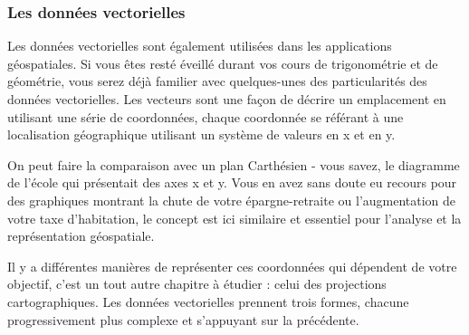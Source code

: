 \subsubsection{Les données vectorielles}\label{label_vectordata}

Les données vectorielles sont également utilisées dans les applications géospatiales. Si vous êtes resté éveillé durant vos cours de trigonométrie et de géométrie, vous serez déjà familier avec quelques-unes des particularités des données vectorielles. Les vecteurs sont une façon de décrire un emplacement en utilisant une série de coordonnées, chaque coordonnée se référant à une localisation géographique utilisant un système de valeurs en x et en y.

On peut faire la comparaison avec un plan Carthésien - vous savez, le diagramme de l'école qui présentait des axes x et y. Vous en avez sans doute eu recours pour des graphiques montrant la chute de votre épargne-retraite ou l'augmentation de votre taxe d'habitation, le concept est ici similaire et essentiel pour l'analyse et la représentation géospatiale.

Il y a différentes manières de représenter ces coordonnées qui dépendent de votre objectif, c'est un tout autre chapitre à étudier : celui des projections cartographiques.
Les données vectorielles prennent trois formes, chacune progressivement plus complexe et s'appuyant sur la précédente.  


